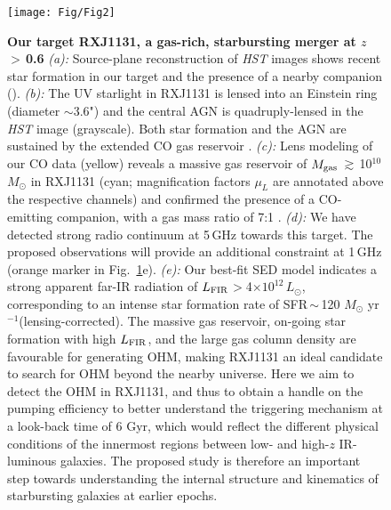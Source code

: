 \documentclass[letterpaper,11pt]{article}
\newcommand{\Lsun}{\mbox{$L_{\odot}$}\xspace}
\newcommand{\Msun}{\mbox{$M_{\odot}$}\xspace}
\newcommand{\LFIR}{\mbox{$L_{\rm FIR}$}\xspace}
\newcommand{\pmOne}{\mbox{$^{-1}$}\xspace}
\newcommand{\Fig}[1]{Fig.~\ref{fig:#1}}
\newcommand{\E}[1]{\mbox{$\times10^{#1}$}}
\newcommand{\ssim}{\,$\sim$\,}
\newcommand{\obs}{observations\xspace}
\begin{document}
\begin{figure}[ptbh]
\centering
\texttt{[image: Fig/Fig2]}
\vspace{-0.85em}
\caption{
{\bf Our target RXJ1131, a gas-rich, starbursting merger at $z$\,$>$\,0.6}
{\em (a):} Source-plane reconstruction of {\it HST} images shows recent star formation in our target and
the presence of a nearby companion (\citealt{Claeskens06a}).
{\em (b):}
The UV starlight in RXJ1131 is lensed into an Einstein ring (diameter $\sim$3.6") and the central AGN is
quadruply-lensed in the {\it HST} image (grayscale). Both star formation and the AGN are sustained
by the extended CO gas reservoir \citep[contours; ][]{Leung17a}.
{\em (c):}
Lens modeling of our CO data (yellow) 
reveals a massive gas reservoir of $M_{\rm gas}$\,$\gtrsim$\,10$^{10}$\Msun in RXJ1131 
(cyan; magnification factors $\mu_{L}$ are annotated above the respective channels) and
confirmed the presence of a CO-emitting companion, with a gas mass ratio of 7:1 \citep[bottom panel;][]{Leung17a}.
{\em (d):}
We have detected strong radio continuum at 5\,GHz towards this target.
The proposed \obs will provide an additional constraint at 1\,GHz (orange marker in \Fig{hst}e).
{\em (e):} Our best-fit SED model indicates a strong apparent far-IR radiation of \LFIR$>$4\E{12}\,\Lsun, corresponding to
an intense star formation rate of SFR\ssim120 \Msun yr\pmOne (lensing-corrected).
The massive gas reservoir, on-going star formation with high \LFIR, and the large gas column density
are favourable for generating OHM, making RXJ1131 an
ideal candidate to search for OHM beyond the nearby universe.
Here we aim to detect the OHM in RXJ1131, and thus to obtain a handle on the pumping efficiency
to better understand the triggering mechanism at a look-back time of 6 Gyr, which
would reflect the different physical conditions of the innermost regions between low- and high-$z$ IR-luminous galaxies.
The proposed study is therefore an important step towards understanding 
the internal structure and kinematics of
starbursting galaxies at earlier epochs.
\label{fig:hst}}
\end{figure}
\end{document}
